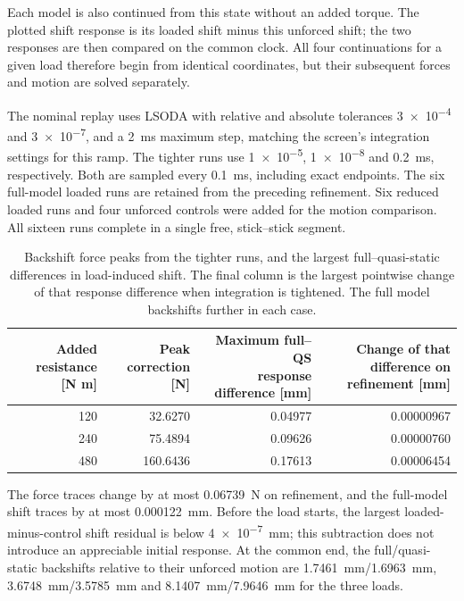 \documentclass[11pt]{report}
\numberwithin{equation}{section}
\begin{document}
Each model is also continued from this state without an added torque.
The plotted shift response is its loaded shift minus this unforced shift;
the two responses are then compared on the common clock. All four
continuations for a given load therefore begin from identical coordinates,
but their subsequent forces and motion are solved separately.

The nominal replay uses LSODA with relative and absolute tolerances
\num{3e-4} and \num{3e-7}, and a \SI{2}{ms} maximum step, matching the
screen's integration settings for this ramp. The tighter runs use
\num{1e-5}, \num{1e-8} and \SI{0.2}{ms}, respectively. Both are sampled
every \SI{0.1}{ms}, including exact endpoints. The six full-model loaded
runs are retained from the preceding refinement. Six reduced loaded runs
and four unforced controls were added for the motion comparison. All
sixteen runs complete in a single free, stick--stick segment.

\begin{table}[H]
 \centering\small
 \setlength{\tabcolsep}{4pt}
 \begin{tabular}{@{}rrrr@{}}
 \toprule
 \makecell{Added resistance\\{}[N m]} &
 \makecell{Peak correction\\{}[N]} &
 \makecell{Maximum full--QS\\response difference [mm]} &
 \makecell{Change of that\\difference on refinement [mm]}\\
 \midrule
 120 & 32.6270 & 0.04977 & 0.00000967\\
 240 & 75.4894 & 0.09626 & 0.00000760\\
 480 & 160.6436 & 0.17613 & 0.00006454\\
 \bottomrule
 \end{tabular}
 \caption{Backshift force peaks from the tighter runs, and the largest
 full--quasi-static differences in load-induced shift. The final column is
 the largest pointwise change of that response difference when integration
 is tightened. The full model backshifts further in each case.}
 \label{tab:secondary_backshift_refinement}
\end{table}

The force traces change by at most \SI{0.06739}{N} on refinement, and
the full-model shift traces by at most \SI{0.000122}{mm}. Before the load
starts, the largest loaded-minus-control shift residual is below
\SI{4e-7}{mm}; this subtraction does not introduce an appreciable initial
response. At the common end, the full/quasi-static backshifts relative to
their unforced motion are \SI{1.7461}{mm}/\SI{1.6963}{mm},
\SI{3.6748}{mm}/\SI{3.5785}{mm} and
\SI{8.1407}{mm}/\SI{7.9646}{mm} for the three loads.
\end{document}
